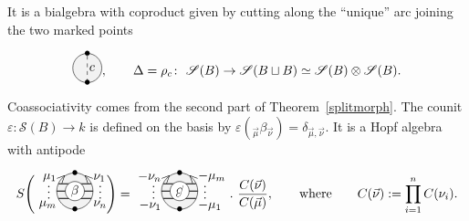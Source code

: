 \documentclass[11pt]{article}
\numberwithin{equation}{section}
\numberwithin{equation}{section}
\begin{document}
\begin{Example}
It is a bialgebra with coproduct given by cutting along the ``unique'' arc joining the two marked points \[
\begin{tikzpicture}[scale = 0.8, baseline = -5pt]
\fill [gray!10] (0,0) circle (0.5);
\draw (0,0) circle (0.5);
\node at (0,-0.5){\small $\bullet$};
\node at (0,0.5){\small $\bullet$};
\draw [dashed] (0,-0.5) -- (0,0.5) node[midway, right = -2pt]{$c$};
\end{tikzpicture}, \qquad
\Delta=\rho_c\colon\ \mathscr{S}(B) \to \mathscr{S}(B \sqcup B) \simeq \mathscr{S}(B) \otimes \mathscr{S}(B).
\]
Coassociativity comes from the second part of Theorem~\ref{splitmorph}. The counit $\varepsilon\colon \mathscr{S}(B) \to k$ is defined on the basis by $\varepsilon(_{\vec{\mu}}\beta_{\vec{\nu}}) = \delta_{\vec{\mu},\vec{\nu}}$.
It is a Hopf algebra with antipode
\[
S\Bigg(\begin{tikzpicture}[scale = 1, baseline = -5pt]
\fill [gray!10] (0,0) circle (0.5);
\draw (0,0) circle (0.5);
\node[rotate = 45] at (135:0.5) {\small $>$};
\node[rotate = -45] at (45:0.5) {\small $<$};
\node at (0,-0.5){\small $\bullet$};
\node at (0,0.5){\small $\bullet$};
\draw [thick] (-0.5,0) node[rotate = 90, above]{\footnotesize $\cdots$} -- (0.5,0) node[rotate = 90, below]{\footnotesize $\cdots$};
\draw [thick] (-0.45,-0.2) node[below left = -2pt]{\small $\mu_m$} -- (0.45,-0.2) node[below right = -2pt]{\small $\nu_n$};
\draw [thick] (-0.45,0.2) node[above left = -2pt]{\small $\mu_1$} -- (0.45,0.2) node[above right = -2pt]{\small $\nu_1$};
\node[circle, fill = white, draw = black, inner sep = 1.5pt] at (0,0) {$\beta$};
\end{tikzpicture}\!\!\Bigg)=
\begin{tikzpicture}[scale = 1, baseline = -5pt]
\fill [gray!10] (0,0) circle (0.5);
\draw (0,0) circle (0.5);
\node[rotate = 45] at (135:0.5) {\small $>$};
\node[rotate = -45] at (45:0.5) {\small $<$};
\node at (0,-0.5){\small $\bullet$};
\node at (0,0.5){\small $\bullet$};
\draw [thick] (-0.5,0) node[rotate = 90, above]{\footnotesize $\cdots$} -- (0.5,0) node[rotate = 90, below]{\footnotesize $\cdots$};
\draw [thick] (-0.45,-0.2) node[below left = -2pt]{\small $-\nu_1$} -- (0.45,-0.2) node[below right = -2pt]{\small $-\mu_1$};
\draw [thick] (-0.45,0.2) node[above left = -2pt]{\small $-\nu_n$} -- (0.45,0.2) node[above right = -2pt]{\small $-\mu_m$};
\node[circle, rotate = 180, fill = white, draw = black, inner sep = 1.5pt] at (0,0) {$\beta$};
\end{tikzpicture}
 .\ \frac{C(\vec{\nu})}{C(\vec{\mu})},\qquad
\text{where}\qquad C(\vec{\nu}):= \prod_{i=1}^n C(\nu_i).
\]
\end{Example}
\end{document}
